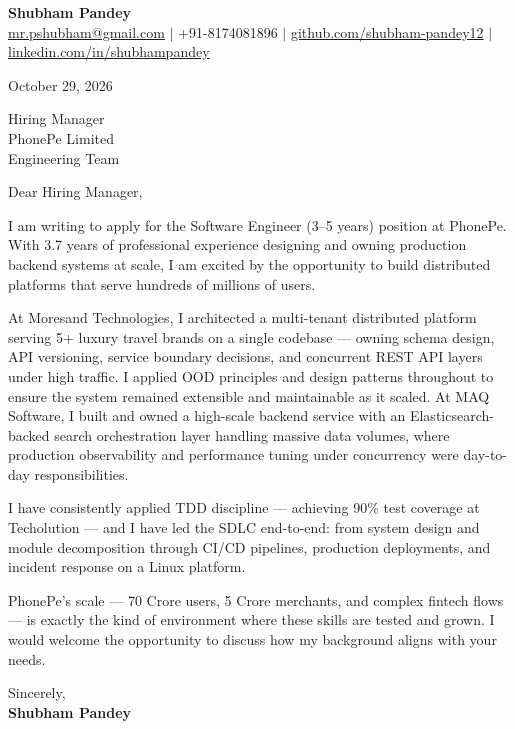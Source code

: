 \documentclass[a4paper,11pt]{article}
\begin{document}
\begin{center}
  \textbf{{\LARGE Shubham Pandey}}\\
  \href{mailto:mr.pshubham@gmail.com}{mr.pshubham@gmail.com} $|$ +91-8174081896 $|$
  \href{https://github.com/shubham-pandey12}{github.com/shubham-pandey12} $|$
  \href{https://www.linkedin.com/in/shubham-pandey-a74716199/}{linkedin.com/in/shubhampandey}
\end{center}

\vspace{12pt}

October 29, 2026

\vspace{12pt}

Hiring Manager\\
PhonePe Limited\\
Engineering Team

\vspace{12pt}

Dear Hiring Manager,

\vspace{8pt}

I am writing to apply for the Software Engineer (3--5 years) position at PhonePe. With 3.7 years of professional experience designing and owning production backend systems at scale, I am excited by the opportunity to build distributed platforms that serve hundreds of millions of users.

\vspace{8pt}

At Moresand Technologies, I architected a multi-tenant distributed platform serving 5+ luxury travel brands on a single codebase --- owning schema design, API versioning, service boundary decisions, and concurrent REST API layers under high traffic. I applied OOD principles and design patterns throughout to ensure the system remained extensible and maintainable as it scaled. At MAQ Software, I built and owned a high-scale backend service with an Elasticsearch-backed search orchestration layer handling massive data volumes, where production observability and performance tuning under concurrency were day-to-day responsibilities.

\vspace{8pt}

I have consistently applied TDD discipline --- achieving 90\% test coverage at Techolution --- and I have led the SDLC end-to-end: from system design and module decomposition through CI/CD pipelines, production deployments, and incident response on a Linux platform.

\vspace{8pt}

PhonePe's scale --- 70 Crore users, 5 Crore merchants, and complex fintech flows --- is exactly the kind of environment where these skills are tested and grown. I would welcome the opportunity to discuss how my background aligns with your needs.

\vspace{12pt}

Sincerely,\\
\textbf{Shubham Pandey}
\end{document}

